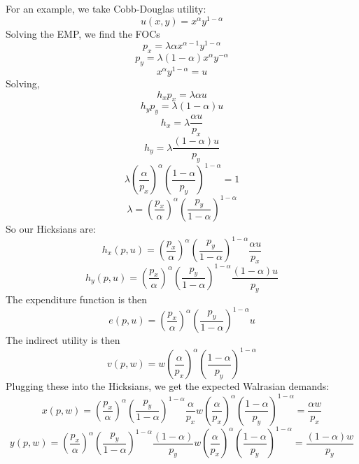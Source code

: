 \documentclass[10pt,letter]{article}
\begin{document}
For an example, we take Cobb-Douglas utility:
\[ u(x, y) = x^\alpha y^{1-\alpha} \]
Solving the EMP, we find the FOCs
\[ p_x = \lambda \alpha x^{\alpha - 1}y^{1- \alpha } \]
\[ p_y = \lambda (1-\alpha) x^{\alpha}y^{- \alpha } \]
\[ x^\alpha y^{1-\alpha} = u \]
Solving,
\[ h_x p_x = \lambda \alpha u \]
\[ h_y p_y = \lambda (1-\alpha) u \]
\[ h_x = \lambda \frac{\alpha u}{p_x} \]
\[ h_y = \lambda \frac{(1-\alpha) u}{p_y} \]
\[ \lambda \left(\frac{\alpha}{p_x}\right)^\alpha\left(\frac{1-\alpha}{p_y} \right)^{1-\alpha} = 1 \]
\[ \lambda =  \left(\frac{p_x}{\alpha}\right)^\alpha\left(\frac{p_y}{1-\alpha} \right)^{1-\alpha} \]
So our Hicksians are:
\[ h_x(p, u) = \left(\frac{p_x}{\alpha}\right)^\alpha\left(\frac{p_y}{1-\alpha} \right)^{1-\alpha} \frac{\alpha u}{p_x} \]
\[ h_y(p,u) = \left(\frac{p_x}{\alpha}\right)^\alpha\left(\frac{p_y}{1-\alpha} \right)^{1-\alpha}\frac{(1-\alpha) u}{p_y} \]
The expenditure function is then
\[ e(p,u) = \left(\frac{p_x}{\alpha}\right)^\alpha\left(\frac{p_y}{1-\alpha} \right)^{1-\alpha} u  \]
The indirect utility is then
\[ v(p,w) = w \left(\frac{\alpha}{p_x}\right)^\alpha\left(\frac{1-\alpha}{p_y} \right)^{1-\alpha} \]
Plugging these into the Hicksians, we get the expected Walrasian demands:
\[ x(p,w) = \left(\frac{p_x}{\alpha}\right)^\alpha\left(\frac{p_y}{1-\alpha} \right)^{1-\alpha} \frac{\alpha }{p_x}w \left(\frac{\alpha}{p_x}\right)^\alpha\left(\frac{1-\alpha}{p_y} \right)^{1-\alpha} = \frac{\alpha w}{p_x} \]
\[ y(p,w) = \left(\frac{p_x}{\alpha}\right)^\alpha\left(\frac{p_y}{1-\alpha} \right)^{1-\alpha} \frac{(1-\alpha) }{p_y}w \left(\frac{\alpha}{p_x}\right)^\alpha\left(\frac{1-\alpha}{p_y} \right)^{1-\alpha} = \frac{(1-\alpha) w}{p_y} \]
\end{document}
